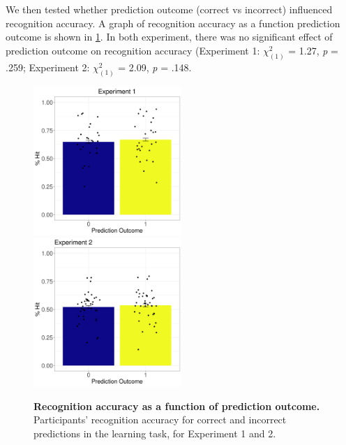\documentclass[a4paper,12pt]{article}
\begin{document}
We then tested whether prediction outcome (correct vs incorrect) influenced recognition accuracy. A graph of recognition accuracy as a function prediction outcome is shown in \ref{fig:prediction_cond}. In both experiment, there was no significant effect of prediction outcome on recognition accuracy (Experiment 1: $\chi^2_{(1)}$ = 1.27, \textit{p} = .259; Experiment 2: $\chi^2_{(1)}$ = 2.09, \textit{p} = .148.


\begin{figure}[ht!]
{\includegraphics[width=0.5\textwidth]{figures/prediction_acc_exp1.png}} \hfill
{\includegraphics[width=0.5\textwidth]{figures/prediction_acc_exp2.png}} 
\caption{\textbf{Recognition accuracy as a function of prediction outcome.}
Participants' recognition accuracy for correct and incorrect predictions in the learning task, for Experiment 1 and 2. }
\label{fig:prediction_cond}
\end{figure}
\end{document}
